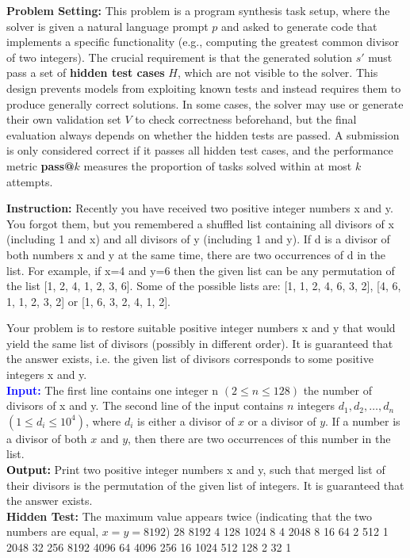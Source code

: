 \documentclass[11pt]{article}
\theoremstyle{definition}
\theoremstyle{remark}
\begin{document}
\textbf{Problem Setting:}
This problem is a program synthesis task setup, where the solver is given a natural language prompt $p$ and asked to generate code that implements a specific functionality (e.g., computing the greatest common divisor of two integers). The crucial requirement is that the generated solution $s'$ must pass a set of \textbf{hidden test cases} $H$, which are not visible to the solver. This design prevents models from exploiting known tests and instead requires them to produce generally correct solutions. In some cases, the solver may use or generate their own validation set $V$ to check correctness beforehand, but the final evaluation always depends on whether the hidden tests are passed. A submission is only considered correct if it passes all hidden test cases, and the performance metric \textbf{pass@$k$} measures the proportion of tasks solved within at most $k$ attempts.



\begin{tcolorbox}[colback=bg,
title=\textbf{Question and Hidden Test in APPS}]
\begin{flushleft}
\textcolor{softblue}{\textbf{Instruction:}} Recently you have received two positive integer numbers x and y. You forgot them, but you remembered a shuffled list containing all divisors of x (including 1 and x) and all divisors of y (including 1 and y). If d is a divisor of both numbers x and y at the same time, there are two occurrences of d in the list. For example, if x=4 and y=6 then the given list can be any permutation of the list [1, 2, 4, 1, 2, 3, 6]. Some of the possible lists are: [1, 1, 2, 4, 6, 3, 2], [4, 6, 1, 1, 2, 3, 2] or [1, 6, 3, 2, 4, 1, 2].

Your problem is to restore suitable positive integer numbers x and y that would yield the same list of divisors (possibly in different order). It is guaranteed that the answer exists, i.e. the given list of divisors corresponds to some positive integers x and y.\\
\textcolor{blue}
{\textbf{Input:}} The first line contains one integer n \((2 \le n \le 128)\) the number of divisors of x and y.
The second line of the input contains \(n\) integers \(d_1, d_2, \ldots, d_n\) \((1 \le d_i \le 10^4)\), where \(d_i\) is either a divisor of \(x\) or a divisor of \(y\). If a number is a divisor of both \(x\) and \(y\), then there are two occurrences of this number in the list.
 \\
\textcolor{Black}{\textbf{Output:}} Print two positive integer numbers x and y, such that merged list of their divisors is the permutation of the given list of integers. It is guaranteed that the answer exists. \\
{\textbf{Hidden Test:}} The maximum value appears twice (indicating that the two numbers are equal, \(x=y=8192\))
28
8192 4 128 1024 8 4 2048 8 16 64 2 512 1 2048 32 256 8192 4096 64 4096 256 16 1024 512 128 2 32 1

\end{flushleft}
\end{tcolorbox}
\end{document}
